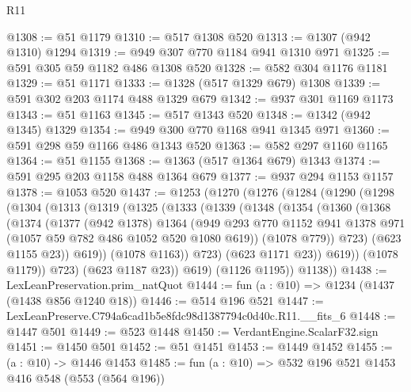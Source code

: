 \begin{lexlean}{R11}
\begin{coremodule}
@1308 := @51 @1179
@1310 := @517 @1308 @520
@1313 := @1307 (@942 @1310) @1294
@1319 := @949 @307 @770 @1184 @941 @1310 @971
@1325 := @591 @305 @59 @1182 @486 @1308 @520
@1328 := @582 @304 @1176 @1181
@1329 := @51 @1171
@1333 := @1328 (@517 @1329 @679) @1308
@1339 := @591 @302 @203 @1174 @488 @1329 @679
@1342 := @937 @301 @1169 @1173
@1343 := @51 @1163
@1345 := @517 @1343 @520
@1348 := @1342 (@942 @1345) @1329
@1354 := @949 @300 @770 @1168 @941 @1345 @971
@1360 := @591 @298 @59 @1166 @486 @1343 @520
@1363 := @582 @297 @1160 @1165
@1364 := @51 @1155
@1368 := @1363 (@517 @1364 @679) @1343
@1374 := @591 @295 @203 @1158 @488 @1364 @679
@1377 := @937 @294 @1153 @1157
@1378 := @1053 @520
@1437 := @1253
    (@1270
      (@1276
        (@1284
          (@1290
            (@1298
              (@1304
                (@1313
                  (@1319
                    (@1325
                      (@1333
                        (@1339
                          (@1348
                            (@1354
                              (@1360
                                (@1368
                                  (@1374
                                    (@1377
                                      (@942 @1378)
                                      @1364
                                      (@949
                                        @293
                                        @770
                                        @1152
                                        @941
                                        @1378
                                        @971
                                        (@1057 @59 @782 @486 @1052 @520 @1080 @619))
                                      (@1078 @779))
                                    @723)
                                  (@623 @1155 @23))
                                @619))
                            (@1078 @1163))
                          @723)
                        (@623 @1171 @23))
                      @619))
                  (@1078 @1179))
                @723)
              (@623 @1187 @23))
            @619)
          (@1126 @1195))
        @1138))
@1438 := LexLeanPreservation.prim_natQuot
@1444 := fun (a : @10) => @1234 (@1437 (@1438 @856 @1240 @18))
@1446 := @514 @196 @521
@1447 := LexLeanPreserve.C794a6cad1b5e8fdc98d1387794c0d40c.R11.__fits_6
@1448 := @1447 @501
@1449 := @523 @1448
@1450 := VerdantEngine.ScalarF32.sign
@1451 := @1450 @501
@1452 := @51 @1451
@1453 := @1449 @1452
@1455 := (a : @10) -> @1446 @1453
@1485 := fun (a : @10) =>
  @532
    @196
    @521
    @1453
    @416
    @548
    (@553 (@564 @196))

\end{coremodule}
\end{lexlean}
